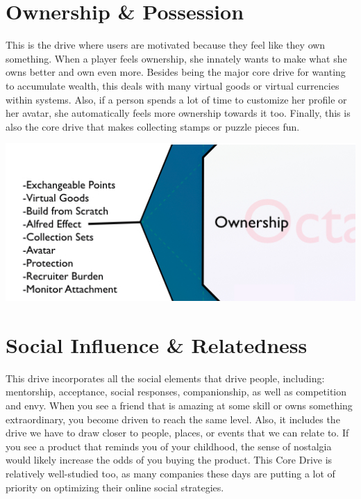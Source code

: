 \documentclass[
]{book}
\begin{document}
\hypertarget{ownership-possession}{%
\section{Ownership \& Possession}\label{ownership-possession}}

This is the drive where users are motivated because they feel like they own something. When a player feels ownership, she innately wants to make what she owns better and own even more. Besides being the major core drive for wanting to accumulate wealth, this deals with many virtual goods or virtual currencies within systems. Also, if a person spends a lot of time to customize her profile or her avatar, she automatically feels more ownership towards it too. Finally, this is also the core drive that makes collecting stamps or puzzle pieces fun.

\begin{center}\includegraphics[width=0.75\linewidth]{assets/images/core-drive-4-ownership-and-possession} \end{center}

\hypertarget{social-influence-relatedness}{%
\section{Social Influence \& Relatedness}\label{social-influence-relatedness}}

This drive incorporates all the social elements that drive people, including: mentorship, acceptance, social responses, companionship, as well as competition and envy. When you see a friend that is amazing at some skill or owns something extraordinary, you become driven to reach the same level. Also, it includes the drive we have to draw closer to people, places, or events that we can relate to. If you see a product that reminds you of your childhood, the sense of nostalgia would likely increase the odds of you buying the product. This Core Drive is relatively well-studied too, as many companies these days are putting a lot of priority on optimizing their online social strategies.
\end{document}
